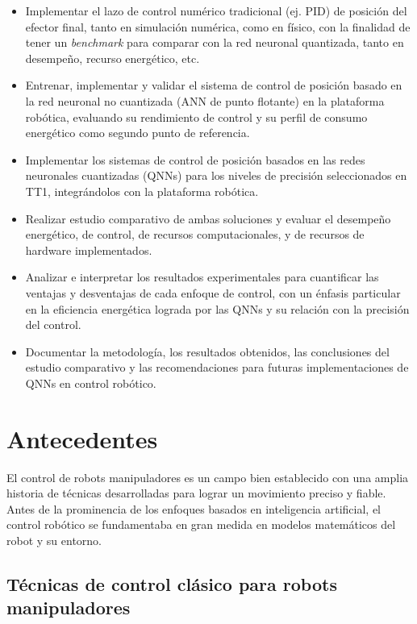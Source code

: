 \documentclass[12pt]{article}
\begin{document}
\begin{itemize}
    \item  Implementar el lazo de control numérico tradicional (ej. PID) de posición del efector final, tanto en simulación numérica, como en físico, con la finalidad de tener un \textit{benchmark} para comparar con la red neuronal quantizada, tanto en desempeño, recurso energético, etc.
    \item Entrenar, implementar y validar el sistema de control de posición basado en la red neuronal no cuantizada (ANN de punto flotante) en la plataforma robótica, evaluando su rendimiento de control y su perfil de consumo energético como segundo punto de referencia.
    \item Implementar los sistemas de control de posición basados en las redes neuronales cuantizadas (QNNs) para los niveles de precisión seleccionados en TT1, integrándolos con la plataforma robótica.
    \item Realizar estudio comparativo de ambas soluciones y evaluar el desempeño energético, de control, de recursos computacionales, y de recursos de hardware implementados.
    \item Analizar e interpretar los resultados experimentales para cuantificar las ventajas y desventajas de cada enfoque de control, con un énfasis particular en la eficiencia energética lograda por las QNNs y su relación con la precisión del control.
    \item Documentar la metodología, los resultados obtenidos, las conclusiones del estudio comparativo y las recomendaciones para futuras implementaciones de QNNs en control robótico. 
\end{itemize}

\section{Antecedentes}
El control de robots manipuladores es un campo bien establecido con una amplia historia de técnicas desarrolladas para lograr un movimiento preciso y fiable. Antes de la prominencia de los enfoques basados en inteligencia artificial, el control robótico se fundamentaba en gran medida en modelos matemáticos del robot y su entorno.
\subsection{Técnicas de control clásico para robots manipuladores}
\end{document}
